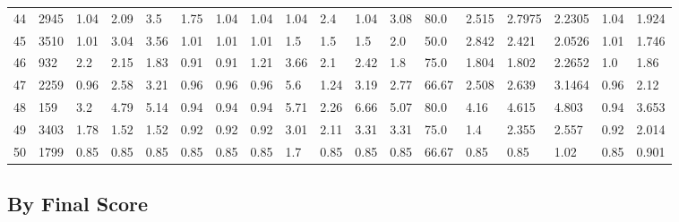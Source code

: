 \documentclass[landscape, 10pt]{report}
\begin{document}
\begin{longtable}{l || l || l | l | l | l | l | l | l | l | l | l | l || l | l | l | l | l}
44 & 2945 & 1.04 & 2.09 & 3.5 & 1.75 & 1.04 & 1.04 & 1.04 & 2.4 & 1.04 & 3.08 & 80.0 & 2.515 & 2.7975 & 2.2305 & 1.04 & 1.924\\ 
\rowcolor{lightgray}45 & 3510 & 1.01 & 3.04 & 3.56 & 1.01 & 1.01 & 1.01 & 1.5 & 1.5 & 1.5 & 2.0 & 50.0 & 2.842 & 2.421 & 2.0526 & 1.01 & 1.746\\ 
46 & 932 & 2.2 & 2.15 & 1.83 & 0.91 & 0.91 & 1.21 & 3.66 & 2.1 & 2.42 & 1.8 & 75.0 & 1.804 & 1.802 & 2.2652 & 1.0 & 1.86\\ 
\rowcolor{lightgray}47 & 2259 & 0.96 & 2.58 & 3.21 & 0.96 & 0.96 & 0.96 & 5.6 & 1.24 & 3.19 & 2.77 & 66.67 & 2.508 & 2.639 & 3.1464 & 0.96 & 2.12\\ 
48 & 159 & 3.2 & 4.79 & 5.14 & 0.94 & 0.94 & 0.94 & 5.71 & 2.26 & 6.66 & 5.07 & 80.0 & 4.16 & 4.615 & 4.803 & 0.94 & 3.653\\ 
\rowcolor{lightgray}49 & 3403 & 1.78 & 1.52 & 1.52 & 0.92 & 0.92 & 0.92 & 3.01 & 2.11 & 3.31 & 3.31 & 75.0 & 1.4 & 2.355 & 2.557 & 0.92 & 2.014\\ 
50 & 1799 & 0.85 & 0.85 & 0.85 & 0.85 & 0.85 & 0.85 & 1.7 & 0.85 & 0.85 & 0.85 & 66.67 & 0.85 & 0.85 & 1.02 & 0.85 & 0.901\\ 
\end{longtable} 
 
\pagebreak\subsection*{By Final Score} 
\end{document}
